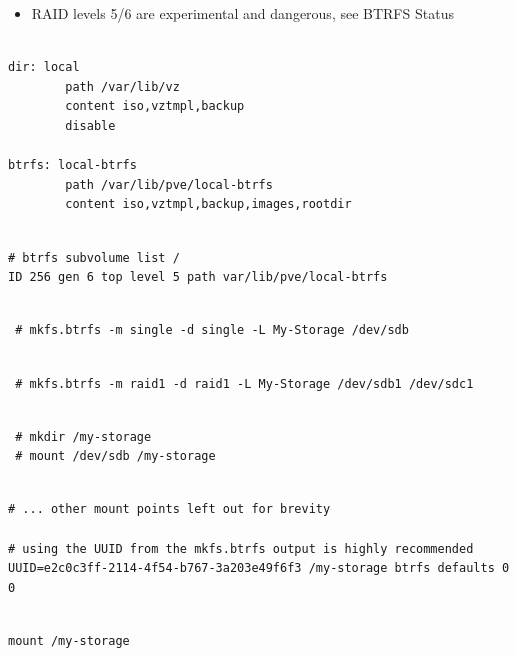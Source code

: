 \begin{itemize}[leftmargin=2cm]

	\item RAID levels 5/6 are experimental and dangerous, see BTRFS Status

\end{itemize}

\begin{lstlisting}

dir: local
        path /var/lib/vz
        content iso,vztmpl,backup
        disable

btrfs: local-btrfs
        path /var/lib/pve/local-btrfs
        content iso,vztmpl,backup,images,rootdir

\end{lstlisting}

\begin{lstlisting}

# btrfs subvolume list /
ID 256 gen 6 top level 5 path var/lib/pve/local-btrfs

\end{lstlisting}

\begin{lstlisting}

 # mkfs.btrfs -m single -d single -L My-Storage /dev/sdb

\end{lstlisting}

\begin{lstlisting}

 # mkfs.btrfs -m raid1 -d raid1 -L My-Storage /dev/sdb1 /dev/sdc1

\end{lstlisting}

\begin{lstlisting}

 # mkdir /my-storage
 # mount /dev/sdb /my-storage

\end{lstlisting}

\begin{lstlisting}

# ... other mount points left out for brevity

# using the UUID from the mkfs.btrfs output is highly recommended
UUID=e2c0c3ff-2114-4f54-b767-3a203e49f6f3 /my-storage btrfs defaults 0 0

\end{lstlisting}

\begin{lstlisting}

mount /my-storage

\end{lstlisting}

